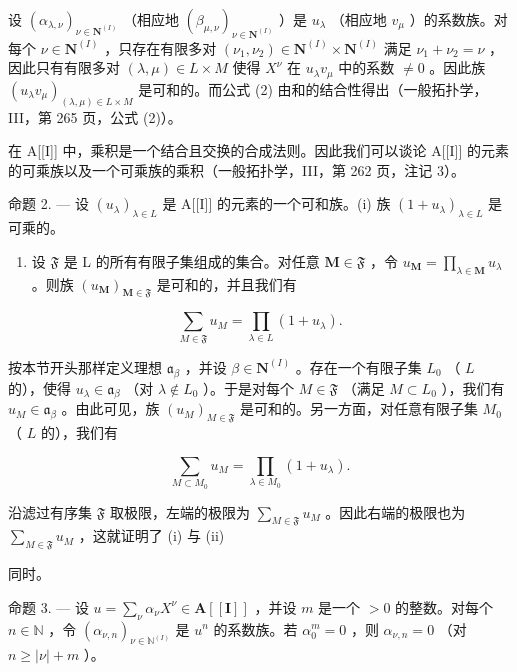 设 \((\alpha_{\lambda, \nu})_{\nu \in \mathbf{N}^{(I)}}\) （相应地 \((\beta_{\mu, \nu})_{\nu \in \mathbf{N}^{(I)}}\) ）是 \(u_{\lambda}\) （相应地 \(v_{\mu}\) ）的系数族。对每个 \(\nu \in \mathbf{N}^{(I)}\) ，只存在有限多对 \((\nu_1, \nu_2) \in \mathbf{N}^{(I)} \times \mathbf{N}^{(I)}\) 满足 \(\nu_1 + \nu_2 = \nu\) ，因此只有有限多对 \((\lambda, \mu) \in L \times M\) 使得 \(X^{\nu}\) 在 \(u_{\lambda}v_{\mu}\) 中的系数 \(\neq 0\) 。因此族 \((u_{\lambda}v_{\mu})_{(\lambda, \mu) \in L \times M}\) 是可和的。而公式 (2) 由和的结合性得出（一般拓扑学，III，第 265 页，公式 (2)）。

在 A{[}{[}I{]}{]} 中，乘积是一个结合且交换的合成法则。因此我们可以谈论 A{[}{[}I{]}{]} 的元素的可乘族以及一个可乘族的乘积（一般拓扑学，III，第 262 页，注记 3）。

命题 2. --- 设 \((u_{\lambda})_{\lambda \in L}\) 是 A{[}{[}I{]}{]} 的元素的一个可和族。(i) 族 \((1 + u_{\lambda})_{\lambda \in L}\) 是可乘的。

\begin{enumerate}
\def\labelenumi{(\roman{enumi})}
\setcounter{enumi}{1}
\tightlist
\item
  设 \(\mathfrak{F}\) 是 L 的所有有限子集组成的集合。对任意 \(\mathbf{M} \in \mathfrak{F}\) ，令 \(u_{\mathbf{M}} = \prod_{\lambda \in \mathbf{M}} u_{\lambda}\) 。则族 \((u_{\mathbf{M}})_{\mathbf{M} \in \mathfrak{F}}\) 是可和的，并且我们有
\end{enumerate}

\[
\sum_ {M \in \mathfrak {F}} u _ {M} = \prod_ {\lambda \in L} (1 + u _ {\lambda}).
\]

按本节开头那样定义理想 \(\mathfrak{a}_{\beta}\) ，并设 \(\beta \in \mathbf{N}^{(I)}\) 。存在一个有限子集 \(L_0\) （ \(L\) 的），使得 \(u_{\lambda} \in \mathfrak{a}_{\beta}\) （对 \(\lambda \notin L_0\) ）。于是对每个 \(M \in \mathfrak{F}\) （满足 \(M \subset L_0\) ），我们有 \(u_M \in \mathfrak{a}_{\beta}\) 。由此可见，族 \((u_M)_{M \in \mathfrak{F}}\) 是可和的。另一方面，对任意有限子集 \(M_0\) （ \(L\) 的），我们有

\[
\sum_ {M \subset M _ {0}} u _ {M} = \prod_ {\lambda \in M _ {0}} (1 + u _ {\lambda}).
\]

沿滤过有序集 \(\mathfrak{F}\) 取极限，左端的极限为 \(\sum_{M\in\mathfrak{F}}u_{M}\) 。因此右端的极限也为 \(\sum_{M\in\mathfrak{F}}u_{M}\) ，这就证明了 (i) 与 (ii)

同时。

命题 3. --- 设 \(u = \sum_{\nu} \alpha_{\nu} X^{\nu} \in \mathbf{A}[[\mathbf{I}]]\) ，并设 \(m\) 是一个 \(> 0\) 的整数。对每个 \(n \in \mathbb{N}\) ，令 \((\alpha_{\nu, n})_{\nu \in \mathbb{N}^{(I)}}\) 是 \(u^n\) 的系数族。若 \(\alpha_0^m = 0\) ，则 \(\alpha_{\nu, n} = 0\) （对 \(n \geqslant |\nu| + m\) ）。

